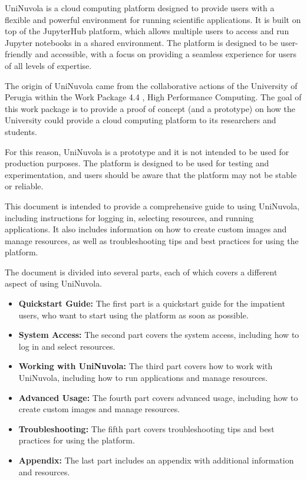 UniNuvola is a cloud computing platform designed to provide users with a flexible and powerful environment for running scientific applications.
It is built on top of the JupyterHub platform, which allows multiple users to access and run Jupyter notebooks in a shared environment.
The platform is designed to be user-friendly and accessible, with a focus on providing a seamless experience for users of all levels of expertise.

The origin of UniNuvola came from the collaborative actions of the University of Perugia within the Work Package 4.4 , High Performance Computing.
The goal of this work package is to provide a proof of concept (and a prototype) on how the University could provide a cloud computing platform to its researchers and students.

For this reason, UniNuvola is a prototype and it is not intended to be used for production purposes. The platform is designed to be used for testing and experimentation, and users should be aware that the platform may not be stable or reliable.

This document is intended to provide a comprehensive guide to using UniNuvola, including instructions for logging in, selecting resources, and running applications.
It also includes information on how to create custom images and manage resources, as well as troubleshooting tips and best practices for using the platform.

The document is divided into several parts, each of which covers a different aspect of using UniNuvola.

\begin{itemize}
	\item \textbf{Quickstart Guide:} The first part is a quickstart guide for the impatient users, who want to start using the platform as soon as possible.
	\item \textbf{System Access:} The second part covers the system access, including how to log in and select resources.
	\item \textbf{Working with UniNuvola:} The third part covers how to work with UniNuvola, including how to run applications and manage resources.
	\item \textbf{Advanced Usage:} The fourth part covers advanced usage, including how to create custom images and manage resources.
	\item \textbf{Troubleshooting:} The fifth part covers troubleshooting tips and best practices for using the platform.
	\item \textbf{Appendix:} The last part includes an appendix with additional information and resources.
\end{itemize}
 
 





